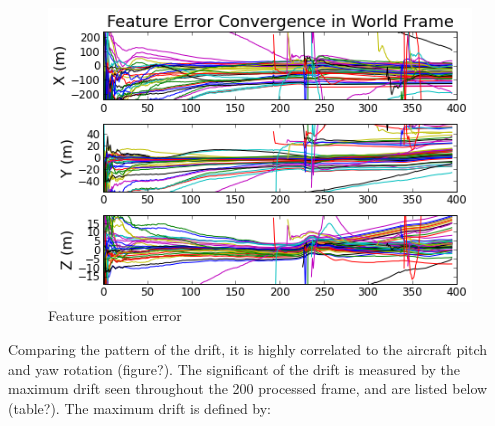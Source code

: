 \begin{figure}[h]
\centering
\includegraphics[width=12cm, keepaspectratio=true]
{./Figures/fltfig/cut1/Figure50.png}
\caption{Feature position error}
\label{fltfig:5}
\end{figure}

Comparing the pattern of the drift, it is highly 
correlated to the aircraft pitch and yaw rotation (figure?). The 
significant of the drift is measured by the maximum drift seen 
throughout the 200 processed frame, and are listed below (table?). The 
maximum drift is defined by:



